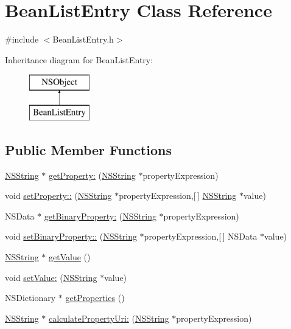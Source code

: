 \hypertarget{interface_bean_list_entry}{
\section{\-Bean\-List\-Entry \-Class \-Reference}
\label{interface_bean_list_entry}
}


{\ttfamily \#include $<$\-Bean\-List\-Entry.\-h$>$}

\-Inheritance diagram for \-Bean\-List\-Entry\-:\begin{figure}[H]
\begin{center}
\leavevmode
\includegraphics[height=2.000000cm]{interface_bean_list_entry}
\end{center}
\end{figure}
\subsection*{\-Public \-Member \-Functions}
\begin{DoxyCompactItemize}
\item 
\hyperlink{class_n_s_string}{\-N\-S\-String} $\ast$ \hyperlink{interface_bean_list_entry_ac850d8ca3c12dbb6b2adc50410bdd3bb}{get\-Property\-:} (\hyperlink{class_n_s_string}{\-N\-S\-String} $\ast$property\-Expression)
\item 
void \hyperlink{interface_bean_list_entry_a9972a43610784930962c3a07929e2894}{set\-Property\-::} (\hyperlink{class_n_s_string}{\-N\-S\-String} $\ast$property\-Expression,\mbox{[}$\,$\mbox{]} \hyperlink{class_n_s_string}{\-N\-S\-String} $\ast$value)
\item 
\-N\-S\-Data $\ast$ \hyperlink{interface_bean_list_entry_aaaeb7bdad6e83ac611d95152ba683a86}{get\-Binary\-Property\-:} (\hyperlink{class_n_s_string}{\-N\-S\-String} $\ast$property\-Expression)
\item 
void \hyperlink{interface_bean_list_entry_a5ff90b02a460ccf12b2ba1feb93ad55f}{set\-Binary\-Property\-::} (\hyperlink{class_n_s_string}{\-N\-S\-String} $\ast$property\-Expression,\mbox{[}$\,$\mbox{]} \-N\-S\-Data $\ast$value)
\item 
\hyperlink{class_n_s_string}{\-N\-S\-String} $\ast$ \hyperlink{interface_bean_list_entry_ad694f474c5c07dc3bc67a81d7aa5c9b0}{get\-Value} ()
\item 
void \hyperlink{interface_bean_list_entry_a7f11b6542664398bf1915d68ffad5793}{set\-Value\-:} (\hyperlink{class_n_s_string}{\-N\-S\-String} $\ast$value)
\item 
\-N\-S\-Dictionary $\ast$ \hyperlink{interface_bean_list_entry_a6ca1c44ff613e17ec49ff237501769be}{get\-Properties} ()
\item 
\hyperlink{class_n_s_string}{\-N\-S\-String} $\ast$ \hyperlink{interface_bean_list_entry_a38d506d6fc24e5b6158ca4ad2083daea}{calculate\-Property\-Uri\-:} (\hyperlink{class_n_s_string}{\-N\-S\-String} $\ast$property\-Expression)
\end{DoxyCompactItemize}
